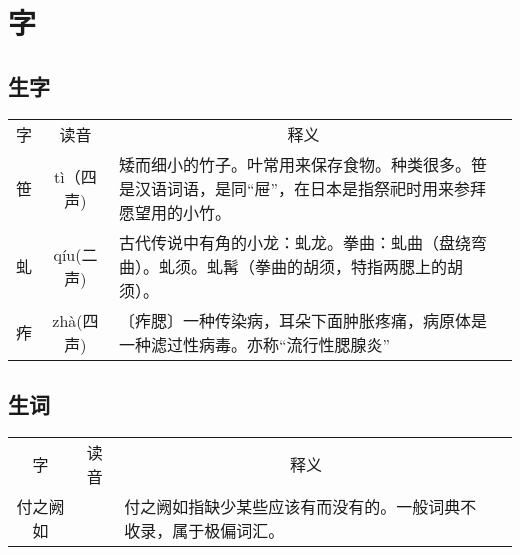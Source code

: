 \documentclass[letter]{book}
\begin{document}
\section*{字}



\subsection*{生字}


\begin{tabular}{ccp{8cm}c}
	\hline
	\multirow{1}{*}{字}
	& \multicolumn{1}{c}{读音} 
	& \multicolumn{1}{c}{释义}\\			
		笹    & t\`{i}（四声)       & 矮而细小的竹子。叶常用来保存食物。种类很多。笹是汉语词语，是同“屉”，在日本是指祭祀时用来参拜愿望用的小竹。           \\
	虬 & q\'{i}u(二声)  &古代传说中有角的小龙：虬龙。拳曲：虬曲（盘绕弯曲）。虬须。虬髯（拳曲的胡须，特指两腮上的胡须）。\\
	痄 & zh\`{a}(四声) &  〔痄腮〕一种传染病，耳朵下面肿胀疼痛，病原体是一种滤过性病毒。亦称“流行性腮腺炎” \\
	\hline
\end{tabular}



\subsection{生词}

\begin{tabular}{ccp{8cm}c}
	\hline
	\multirow{1}{*}{字}
	& \multicolumn{1}{c}{读音} 
	& \multicolumn{1}{c}{释义}\\			
	付之阙如    &       & 付之阙如指缺少某些应该有而没有的。一般词典不收录，属于极偏词汇。         \\
	\hline
\end{tabular}
\end{document}
